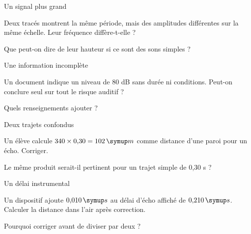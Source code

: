 \clearpage{}
\par\noindent\begin{minipage}{\linewidth}
\begin{exercice}[3]{Un signal plus grand}
\begin{questions}
\item Deux tracés montrent la même période, mais des amplitudes différentes sur la même échelle. Leur fréquence diffère-t-elle ?
\item Que peut-on dire de leur hauteur si ce sont des sons simples ?
\end{questions}
\end{exercice}
\end{minipage}
\par\noindent\begin{minipage}{\linewidth}
\begin{exercice}[3]{Une information incomplète}
\begin{questions}
\item Un document indique un niveau de 80 dB sans durée ni conditions. Peut-on conclure seul sur tout le risque auditif ?
\item Quels renseignements ajouter ?
\end{questions}
\end{exercice}
\end{minipage}
\par\noindent\begin{minipage}{\linewidth}
\begin{exercice}[3]{Deux trajets confondus}
\begin{questions}
\item Un élève calcule $340\times0{,}30=102\unite m$ comme distance d’une paroi pour un écho. Corriger.
\item Le même produit serait-il pertinent pour un trajet simple de 0,30 s ?
\end{questions}
\end{exercice}
\end{minipage}
\par\noindent\begin{minipage}{\linewidth}
\begin{exercice}[3]{Un délai instrumental}
\begin{questions}
\item Un dispositif ajoute $0{,}010\unite s$ au délai d’écho affiché de $0{,}210\unite s$. Calculer la distance dans l’air après correction.
\item Pourquoi corriger avant de diviser par deux ?
\end{questions}
\end{exercice}
\end{minipage}
